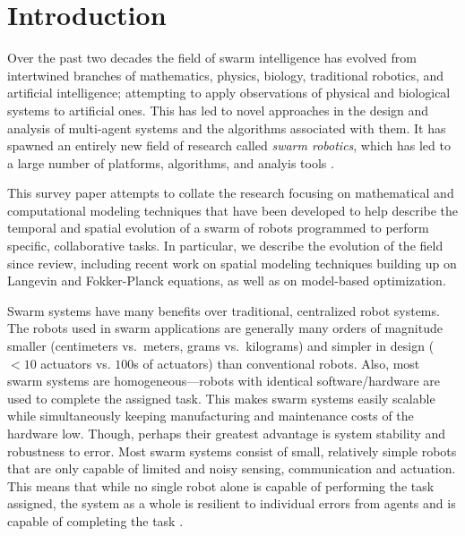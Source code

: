 \documentclass[Main.tex]{subfiles}
\begin{document}
\section{Introduction}
Over the past two decades the field of swarm intelligence has evolved from intertwined branches of mathematics, physics, biology, traditional robotics, and artificial intelligence; attempting to apply observations of physical and biological systems to artificial ones. This has led to novel approaches in the design and analysis of multi-agent systems and the algorithms associated with them. It has spawned an entirely new field of research called \emph{swarm robotics}\cite{Sahin2005}, which has led to a large number of platforms, algorithms, and analyis tools \cite{Brambilla2013}.

This survey paper attempts to collate the research focusing on mathematical and computational modeling techniques that have been developed to help describe the temporal and spatial evolution of a swarm of robots programmed to perform specific, collaborative tasks. In particular, we describe the evolution of the field since \cite{Lerman2005} review, including recent work on spatial modeling techniques building up on Langevin and Fokker-Planck equations, as well as on model-based optimization.

Swarm systems have many benefits over traditional, centralized robot systems. The robots used in swarm applications are generally many orders of magnitude smaller (centimeters vs.\ meters, grams vs.\ kilograms) and simpler in design ($<10$ actuators vs. $100$s of actuators) than conventional robots. Also, most swarm systems are homogeneous---robots with identical software/hardware are used to complete the assigned task. This makes swarm systems easily scalable while simultaneously keeping manufacturing and maintenance costs of the hardware low. Though, perhaps their greatest advantage is system stability and robustness to error. Most swarm systems consist of small, relatively simple robots that are only capable of limited and noisy sensing, communication and actuation. This means that while no single robot alone is capable of performing the task assigned, the system as a whole is resilient to individual errors from agents and is capable of completing the task \cite{Winfield2005}.
\end{document}
